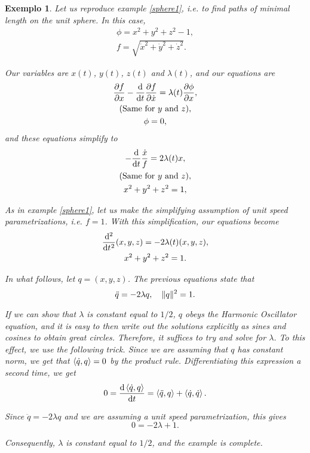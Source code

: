 \documentclass{article}
\theoremstyle{plain}
\theoremstyle{plain}
\newtheorem{example}{Exemplo}
\theoremstyle{nonumberplain}
\theoremstyle{empty}
\DeclarePairedDelimiter\norm{\lVert}{\rVert}
\begin{document}
\begin{example}
Let us reproduce example \ref{sphere1}, i.e. to find paths of minimal length on the unit sphere.  In this case,
\begin{gather*}
\phi = x^2 + y^2 + z^2 - 1,\\
f = \sqrt{\dot x^2 + \dot y^2 + \dot z^2}.
\end{gather*}

Our variables are $x(t)$, $y(t)$, $z(t)$ and $\lambda(t)$, and our equations are
\begin{gather*}
\diffp f x - \diff*{\diffp f {\dot x}}t = \lambda(t) \diffp \phi x,\\
\text{(Same for $y$ and $z$)},\\
\phi = 0,
\end{gather*}
and these equations simplify to
\begin{gather*}
- \diff*{\frac{\dot x}f}t = 2 \lambda(t) x,\\
\text{(Same for $y$ and $z$)},\\
x^2 + y^2 + z^2 = 1,
\end{gather*}

As in example \ref{sphere1}, let us make the simplifying assumption of unit speed parametrizations, i.e. $f = 1$. With this simplification, our equations become
\begin{gather*}
\diff*[2]{(x,y,z)}{t} = -2 \lambda(t) (x,y,z),\\
x^2 + y^2 + z^2 = 1.
\end{gather*}

In what follows, let $q = (x,y,z)$. The previous equations state that
\[\ddot q = - 2 \lambda q, \quad \norm{q}^2 = 1.\]

If we can show that $\lambda$ is constant equal to $1/2$, $q$ obeys the Harmonic Oscillator equation, and it is easy to then write out the solutions explicitly as sines and cosines to obtain great circles. Therefore, it suffices to try and solve for $\lambda$. To this effect, we use the following trick. Since we are assuming that $q$ has constant norm, we get that $\braket{\dot q, q} = 0$ by the product rule. Differentiating this expression a second time, we get
\[0 = \diff{\braket{\dot q, q}}t = \braket{\ddot q, q} + \braket{\dot q, \dot q}.\]

Since $\ddot q = - 2 \lambda q$ and we are assuming a unit speed parametrization, this gives
\[0 = - 2 \lambda + 1.\]

Consequently, $\lambda$ is constant equal to $1/2$, and the example is complete.
\end{example}
\end{document}
